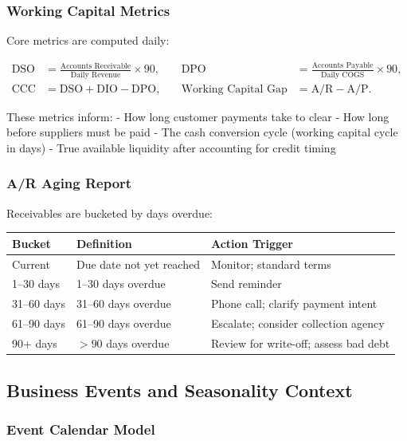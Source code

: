 \documentclass[10pt,a4paper]{article}
\begin{document}
\subsubsection{Working Capital Metrics}

Core metrics are computed daily:

\begin{align*}
\text{DSO} &= \frac{\text{Accounts Receivable}}{\text{Daily Revenue}} \times 90, &\quad
\text{DPO} &= \frac{\text{Accounts Payable}}{\text{Daily COGS}} \times 90,\\
\text{CCC} &= \text{DSO} + \text{DIO} - \text{DPO}, &\quad
\text{Working Capital Gap} &= \text{A/R} - \text{A/P}.
\end{align*}

These metrics inform:
- How long customer payments take to clear
- How long before suppliers must be paid
- The cash conversion cycle (working capital cycle in days)
- True available liquidity after accounting for credit timing

\subsubsection{A/R Aging Report}

Receivables are bucketed by days overdue:

\begin{center}
\begin{tabularx}{\textwidth}{@{}p{3.0cm}p{4.0cm}Y@{}}
\toprule
\textbf{Bucket} & \textbf{Definition} & \textbf{Action Trigger}\\
\midrule
Current & Due date not yet reached & Monitor; standard terms\\
1--30 days & 1--30 days overdue & Send reminder\\
31--60 days & 31--60 days overdue & Phone call; clarify payment intent\\
61--90 days & 61--90 days overdue & Escalate; consider collection agency\\
90+ days & $>90$ days overdue & Review for write-off; assess bad debt\\
\bottomrule
\end{tabularx}
\end{center}

\subsection{Business Events and Seasonality Context}

\subsubsection{Event Calendar Model}
\end{document}
